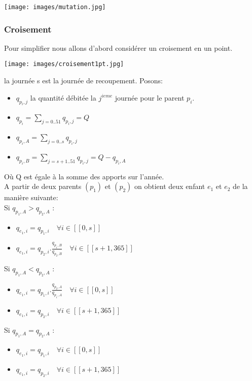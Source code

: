 \documentclass[a4paper]{report}
\begin{document}
\begin{center}
\texttt{[image: images/mutation.jpg]}
\end{center}
\subsubsection{Croisement}
Pour simplifier nous allons d'abord considérer un croisement en un point.
 \begin{center}
 \texttt{[image: images/croisement1pt.jpg]}
 \end{center}
 la journée s est la journée de recoupement.  Posons: 
 \begin{itemize}
 \item $q_{p_{i},j}$ la quantité débitée la $j^{ieme}$ journée pour le parent $p_i$.
   \item $q_{p_{i}}=\sum_{j=0..51}q_{p_{i},j}=Q$
 \item $q_{p_{i},A}=\sum_{j=0..s}q_{p_{i},j}$
  \item $q_{p_{i},B}=\sum_{j=s+1..51}q_{p_{i},j}=Q-q_{p_{i},A}$\\
 \end{itemize}
 Où Q est égale à la somme des apports sur l'année.\\
A partir de deux parents $(p_{1})$ et $(p_{2 })$ on obtient deux enfant $e_{1}$ et $e_{2}$ de la manière suivante:\\
Si $q_{p_{1},A}> q_{p_{2},A}$ :\\
 \begin{itemize}
 \item $q_{e_{1},i}=q_{p_{1},i}\quad \forall i \in [[0,s]]$
  \item $q_{e_{1},i}=q_{p_{2},i}.\frac{q_{p_{1},B}}{q_{p_{2},B}}\quad \forall i \in [[s+1,365]]$\\
 \end{itemize}
 Si $q_{p_{1},A}<q_{p_{2},A}$ :\\
 \begin{itemize}
 \item $q_{e_{1},i}=q_{p_{1},i}.\frac{q_{p_{2},A}}{q_{p_{1},A}}\quad \forall i \in [[0,s]]$
  \item $q_{e_{1},i}=q_{p_{2},i}\quad \forall i \in [[s+1,365]]$\\
 \end{itemize}
  Si $q_{p_{1},A}=q_{p_{2},A}$ :\\
 \begin{itemize}
 \item $q_{e_{1},i}=q_{p_{1},i}\quad \forall i \in [[0,s]]$
  \item $q_{e_{1},i}=q_{p_{2},i}\quad \forall i \in [[s+1,365]]$\\
 \end{itemize}
 
\end{document}
